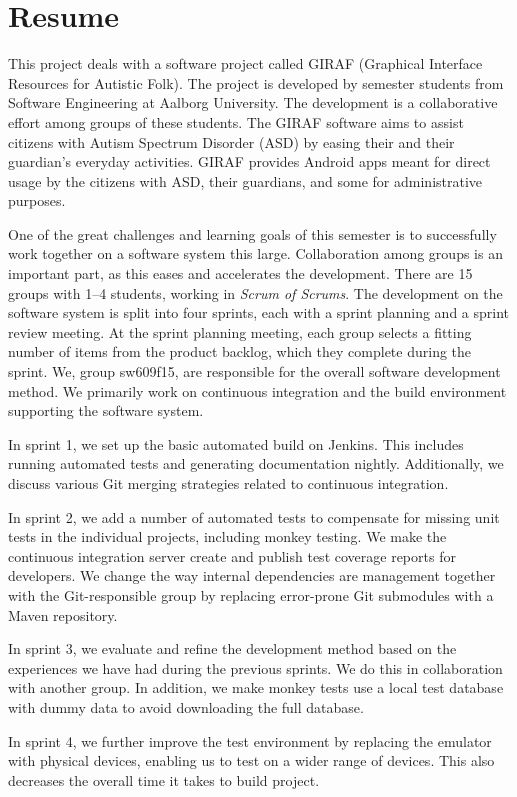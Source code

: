 \chapter*{Resume}
This project deals with a software project called GIRAF (Graphical Interface Resources for Autistic Folk). The project is developed by  semester students from Software Engineering at Aalborg University. The development is a collaborative effort among groups of these students. The GIRAF software aims to assist citizens with Autism Spectrum Disorder (ASD) by easing their and their guardian's everyday activities. GIRAF provides Android apps meant for direct usage by the citizens with ASD, their guardians, and some for administrative purposes.

One of the great challenges and learning goals of this semester is to successfully work together on a software system this large. Collaboration among groups is an important part, as this eases and accelerates the development. There are 15 groups with 1--4 students, working in \emph{Scrum of Scrums}. The development on the software system is split into four sprints, each with a sprint planning and a sprint review meeting. At the sprint planning meeting, each group selects a fitting number of items from the product backlog, which they complete during the sprint. We, group sw609f15, are responsible for the overall software development method. We primarily work on continuous integration and the build environment supporting the software system.

In sprint 1, we set up the basic automated build on Jenkins. This includes running automated tests and generating documentation nightly. Additionally, we discuss various Git merging strategies related to continuous integration.

In sprint 2, we add a number of automated tests to compensate for missing unit tests in the individual projects, including monkey testing. We make the continuous integration server create and publish test coverage reports for developers. We change the way internal dependencies are management together with the Git-responsible group by replacing error-prone Git submodules with a Maven repository.

In sprint 3, we evaluate and refine the development method based on the experiences we have had during the previous sprints. We do this in collaboration with another group. In addition, we make monkey tests use a local test database with dummy data to avoid downloading the full database.

In sprint 4, we further improve the test environment by replacing the emulator with physical devices, enabling us to test on a wider range of devices. This also decreases the overall time it takes to build project.
